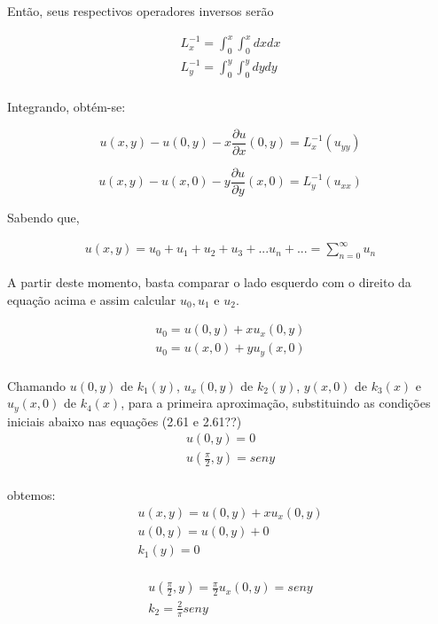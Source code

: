 Então, seus respectivos operadores inversos serão

\begin{gather*}
L_{x}^{-1} = \int_0^x \int_0^x  dxdx\\
L_{y}^{-1} = \int_0^y \int_0^y  dydy \\
\end{gather*}

Integrando, obtém-se:

\begin{equation}
u(x,y) - u(0,y) - x\dfrac{\partial u}{\partial x}(0,y) = L_{x}^{-1}(u_{yy})
\end{equation}

\begin{equation}
u(x,y) - u(x,0) - y\dfrac{\partial u}{\partial y}(x,0) = L_{y}^{-1}(u_{xx})  
\end{equation}

Sabendo que,

\begin{gather}
u(x,y) = u_{0} + u_{1} + u_{2} + u_{3} + ... u_{n} + ... = \sum_{n=0}^{\infty}u_{n}
\end{gather}

A partir deste momento, basta comparar o lado esquerdo com o direito da equação acima e assim calcular  $u_{0}, u_{1}$  e $u_{2}$.

\begin{gather}
u_{0} = u(0,y) + xu_{x}(0,y)\nonumber\\
u_{0} = u(x,0) + yu_{y}(x,0)\nonumber\\
\end{gather}

Chamando $u(0,y)$ de  $k_{1}(y)$, $u_{x}(0,y)$ de $k_{2}(y)$, $y(x,0)$ de $k_{3}(x)$ e $u_{y}(x,0)$ de $k_{4}(x)$, para a primeira aproximação, substituindo as condições iniciais abaixo nas equações (2.61 e 2.61??)
\begin{gather}
u(0,y) = 0\nonumber\\
u\left(\frac{\pi}{2},y\right) = seny\nonumber\\
\end{gather}

obtemos:
\begin{gather}
u(x,y) = u(0,y) + xu_{x}(0,y)\nonumber\\
u(0,y) = u(0,y) + 0\nonumber\\
k_{1}(y) = 0\nonumber\\
\end{gather}

\begin{gather}
u\left(\frac{\pi}{2},y\right) = \frac{\pi}{2}u_{x}(0,y) = seny \nonumber\\
k_{2} = \frac{2}{\pi}seny \nonumber\\
\end{gather}

